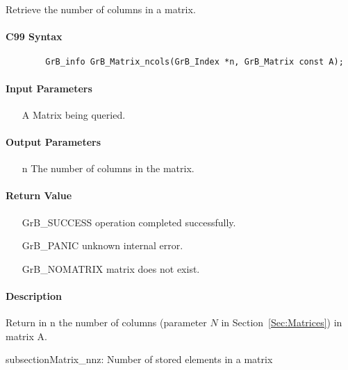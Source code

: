 Retrieve the number of columns in a matrix.

\paragraph{C99 Syntax}

\begin{verbatim}
        GrB_info GrB_Matrix_ncols(GrB_Index *n, GrB_Matrix const A);
\end{verbatim}

\paragraph{Input Parameters}

\begin{itemize}[leftmargin=1.1in]
    \item[{\sf A}] Matrix being queried.
\end{itemize}

\paragraph{Output Parameters}
\begin{itemize}[leftmargin=1.1in]
    \item[{\sf n}] The number of columns in the matrix.
\end{itemize}

\paragraph{Return Value}

\begin{itemize}[leftmargin=2.1in]
\item[{\sf GrB\_SUCCESS}]   operation completed successfully.
\item[{\sf GrB\_PANIC}]     unknown internal error.
\item[{\sf GrB\_NOMATRIX}]  matrix does not exist.
\end{itemize}

\paragraph{Description}

Return in {\sf n} the number of columns (parameter $N$ in Section~\ref{Sec:Matrices}) in matrix {\sf A}.

subsection{{\sf Matrix\_nnz}: Number of stored elements in a matrix}


